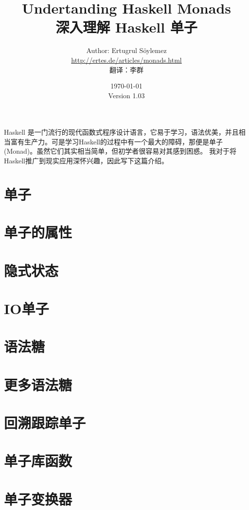 \documentclass[11pt]{article} %
\title{Undertanding Haskell Monads\\
深入理解 Haskell 单子}
\author{Author: Ertugrul S\"oylemez\\
\url{http://ertes.de/articles/monads.html}\\[2mm]
翻译：李群}
\date{\today\\
Version 1.03}
\begin{document}
\maketitle

Haskell 是一门流行的现代函数式程序设计语言，它易于学习，语法优美，并且相当富有生产力。可是学习Haskell的过程中有一个最大的障碍，那便是单子(Monad)。虽然它们其实相当简单，但初学者很容易对其感到困惑。 我对于将Haskell推广到现实应用深怀兴趣，因此写下这篇介绍。

\renewcommand\contentsname{目录}
\tableofcontents





\section{单子}
\section{单子的属性}
\section{隐式状态}
\section{IO单子}
\section{语法糖}
\section{更多语法糖}
\section{回溯跟踪单子}
\section{单子库函数}
\section{单子变换器}
\end{document}
